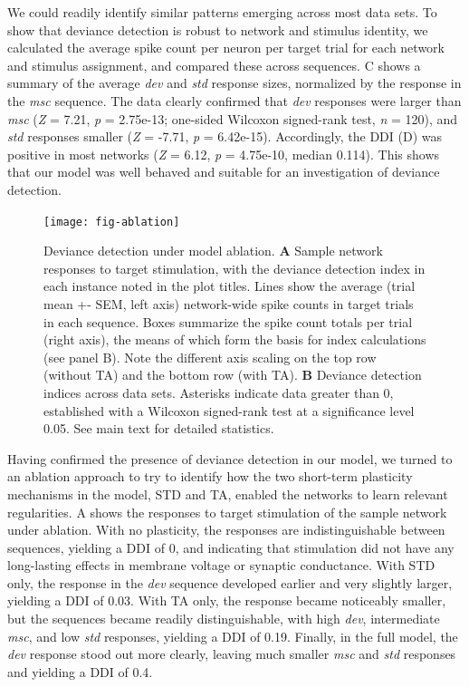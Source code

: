 \documentclass[9pt,lineno,onehalfspacing]{elife}
\newcommand{\dev}{\textit{dev}}
\newcommand{\msc}{\textit{msc}}
\newcommand{\std}{\textit{std}}
\begin{document}
We could readily identify similar patterns emerging across most data sets. To show that deviance detection is robust to network and stimulus identity, we calculated the average spike count per neuron per target trial for each network and stimulus assignment, and compared these across sequences. C shows a summary of the average \dev{} and \std{} response sizes, normalized by the response in the \msc{} sequence. The data clearly confirmed that \dev{} responses were larger than \msc{} (\textit{Z} = 7.21, \textit{p} = 2.75e-13; one-sided Wilcoxon signed-rank test, \textit{n} = 120), and \std{} responses smaller (\textit{Z} = -7.71, \textit{p} = 6.42e-15). Accordingly, the DDI (D) was positive in most networks (\textit{Z} = 6.12, \textit{p} = 4.75e-10, median 0.114). This shows that our model was well behaved and suitable for an investigation of deviance detection.

\begin{figure}
    \texttt{[image: fig-ablation]}
    \caption{%
        Deviance detection under model ablation.
        \textbf{A} Sample network responses to target stimulation, with the deviance detection index in each instance noted in the plot titles. Lines show the average (trial mean +- SEM, left axis) network-wide spike counts in target trials in each sequence. Boxes summarize the spike count totals per trial (right axis), the means of which form the basis for index calculations (see panel B). Note the different axis scaling on the top row (without TA) and the bottom row (with TA).
        \textbf{B} Deviance detection indices across data sets. Asterisks indicate data greater than 0, established with a Wilcoxon signed-rank test at a significance level 0.05. See main text for detailed statistics.
    }
    \label{fig:ablation}
\end{figure}

Having confirmed the presence of deviance detection in our model, we turned to an ablation approach to try to identify how the two short-term plasticity mechanisms in the model, STD and TA, enabled the networks to learn relevant regularities. A shows the responses to target stimulation of the sample network under ablation. With no plasticity, the responses are indistinguishable between sequences, yielding a DDI of 0, and indicating that stimulation did not have any long-lasting effects in membrane voltage or synaptic conductance. With STD only, the response in the \dev{} sequence developed earlier and very slightly larger, yielding a DDI of 0.03. With TA only, the response became noticeably smaller, but the sequences became readily distinguishable, with high \dev{}, intermediate \msc{}, and low \std{} responses, yielding a DDI of 0.19. Finally, in the full model, the \dev{} response stood out more clearly, leaving much smaller \msc{} and \std{} responses and yielding a DDI of 0.4.
\end{document}
